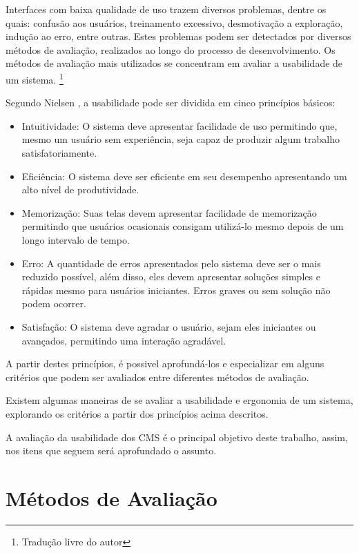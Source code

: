 Interfaces com baixa qualidade de uso trazem diversos problemas, dentre os quais:
confusão aos usuários, treinamento excessivo, desmotivação a exploração, indução ao
erro, entre outras. Estes problemas podem ser detectados por diversos métodos de
avaliação, realizados ao longo do processo de desenvolvimento. Os métodos de
avaliação mais utilizados se concentram em avaliar a usabilidade de um sistema.
\cite{maguire_context_of_use}\footnote{Tradução livre do autor}


Segundo Nielsen \cite{nielsen_usabilidade}, a usabilidade pode ser dividida em cinco princípios básicos: 

\begin{itemize}
  \item Intuitividade: O sistema deve apresentar facilidade de uso permitindo que, mesmo um usuário sem experiência, seja capaz de produzir algum trabalho satisfatoriamente.
  \item Eficiência: O sistema deve ser eficiente em seu desempenho apresentando um alto nível de produtividade.
  \item Memorização: Suas telas devem apresentar facilidade de memorização permitindo que usuários ocasionais consigam utilizá-lo mesmo depois de um longo intervalo de tempo.
  \item Erro: A quantidade de erros apresentados pelo sistema deve ser o mais reduzido possível, além disso, eles devem apresentar soluções simples e rápidas mesmo para usuários iniciantes. Erros graves ou sem solução não podem ocorrer.
  \item Satisfação: O sistema deve agradar o usuário, sejam eles iniciantes ou avançados, permitindo uma interação agradável.
\end{itemize}


A partir destes princípios, é possivel aprofundá-los e especializar em alguns critérios que podem ser avaliados entre diferentes métodos de avaliação.

Existem algumas maneiras de se avaliar a usabilidade e ergonomia de um sistema, explorando os critérios a partir dos princípios acima descritos.

A avaliação da usabilidade dos CMS é o principal objetivo deste trabalho, assim, nos itens que seguem será aprofundado o assunto.

\section{Métodos de Avaliação}

